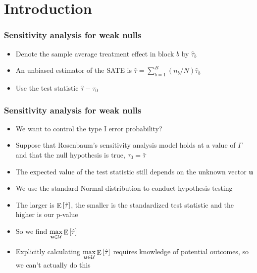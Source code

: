 \documentclass[table, xcolor = {dvipsnames}, 9pt]{beamer}
\theoremstyle{plain}
\DeclareMathOperator{\E}{\rm{E}}
\begin{document}
\section{\normalsize Introduction}
\begin{frame}[t]
\frametitle{Sensitivity analysis for weak nulls} 
\vfill
\begin{itemize}
\item Denote the sample average treatment effect in block $b$ by $\hat{\tau}_b$
\item An unbiased estimator of the SATE is $\hat{\tau} = \sum \limits_{b = 1}^B (n_b/N)\hat{\tau}_b$
\item Use the test statistic $\hat{\tau} - \tau_0$

\end{itemize}  
\vfill
\end{frame}
\begin{frame}[t]
\frametitle{Sensitivity analysis for weak nulls} 
\vfill
\begin{itemize}
\item We want to control the type I error probability? 
\item Suppose that Rosenbaum's sensitivity analysis model holds at a value of $\Gamma$ and that the null hypothesis is true, $\tau_0 = \bar{\tau}$
\item The expected value of the test statistic still depends on the unknown vector $\bm{u}$
\item We use the standard Normal distribution to conduct hypothesis testing
\item The larger is $\E\left[\hat{\tau}\right]$, the smaller is the standardized test statistic and the higher is our p-value
\item So we find $\max \limits_{\bm{u} \in \mathcal{U}} \E\left[\hat{\tau}\right]$
\item Explicitly calculating $\max \limits_{\bm{u} \in \mathcal{U}} \E\left[\hat{\tau}\right]$ requires knowledge of potential outcomes, so we can't actually do this
\end{itemize}  
\vfill
\end{frame}
\end{document}
